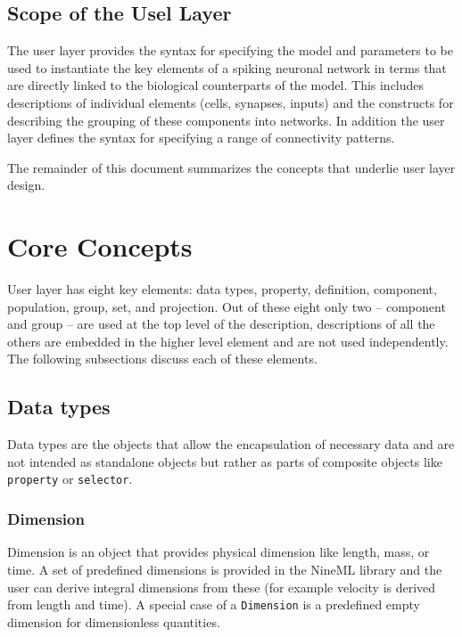 \documentclass{article}
\begin{document}
\subsection{Scope of the Usel Layer}

The user layer provides the syntax for specifying the model and parameters to
be used to instantiate the key elements of a spiking neuronal network in terms
that are directly linked to the biological counterparts of the model. This
includes descriptions of individual elements (cells, synapses, inputs) and the
constructs for describing the grouping of these components into networks. In
addition the user layer defines the syntax for specifying a range of
connectivity patterns.

The remainder of this document summarizes the concepts that underlie user
layer design.

\section{Core Concepts}

User layer has eight key elements: data types, property, definition,
component, population, group, set, and projection. Out of these eight
only two -- component and group -- are used at the top level of the
description, descriptions of all the others are embedded in the higher
level element and are not used independently. The following subsections
discuss each of these elements.

\subsection{Data types}

Data types are the objects that allow the encapsulation of necessary data
and are not intended as standalone objects but rather as parts of composite
objects like {\tt property} or {\tt selector}.

\subsubsection{Dimension}

Dimension is an object that provides physical dimension like length,
mass, or time. A set of predefined dimensions is provided in the
NineML library and the user can derive integral dimensions from these
(for example velocity is derived from length and time). A special case
of a {\tt Dimension} is a predefined empty dimension for dimensionless
quantities.
\end{document}
